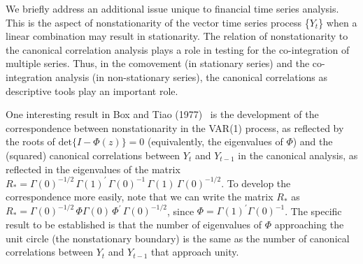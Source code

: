 We briefly address an additional issue unique to financial time series analysis.  This is the aspect of nonstationarity of the vector time series process \{$Y_t$\} when a linear combination may result in stationarity. The relation of nonstationarity to the canonical correlation analysis plays a role in testing for the co-integration of multiple series. Thus, in the comovement (in stationary series) and the co-integration analysis (in non-stationary series), the canonical correlations as descriptive tools play an important role.


One interesting result in Box and Tiao (1977)~\cite{box77} is the development of the correspondence between nonstationarity in the VAR(1) process, as reflected by the roots of $\mbox{det}\{ I - \Phi(z) \} = 0$ (equivalently, the eigenvalues of $\Phi$) and the (squared) canonical correlations between $Y_t$ and $Y_{t-1}$ in the canonical analysis, as reflected in the eigenvalues of the matrix $R_* = \Gamma (0)^{-1/2}\, \Gamma (1)^{\prime}\, \Gamma (0)^{-1}\, \Gamma (1)\, \Gamma (0)^{-1/2}$. To develop the correspondence more easily, note that we can write the matrix $R_*$ as $R_* = \Gamma (0)^{-1/2}\, \Phi \Gamma (0)\, \Phi^{\prime}\, \Gamma (0)^{-1/2}$, since $\Phi = \Gamma (1)^{\prime} \Gamma (0)^{-1}$. The specific result to be established is that the number of eigenvalues of $\Phi$ approaching the unit circle (the nonstationary boundary) is the same as the number of canonical correlations between $Y_t$ and $Y_{t-1}$ that approach unity.  


